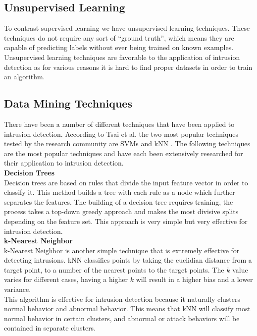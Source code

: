 \documentclass[12pt]{article} %
\begin{document}
\subsection{Unsupervised Learning}
To contrast supervised learning we have unsupervised learning techniques. These techniques do not require any sort of ``ground truth'', which means they are capable of predicting labels without ever being trained on known examples. Unsupervised learning techniques are favorable to the application of intrusion detection as for various reasons it is hard to find proper datasets in order to train an algorithm.\\

\subsection{Data Mining Techniques}
There have been a number of different techniques that have been applied to intrusion detection. According to Tsai et al. the two most popular techniques tested by the research community are SVMs and kNN \cite{tsai09}. The following techniques are the most popular techniques and have each been extensively researched for their application to intrusion detection.\\
 
\noindent
\textbf{Decision Trees}\\
Decision trees are based on rules that divide the input feature vector in order to classify it. This method builds a tree with each rule as a node which further separates the features. The building of a decision tree requires training, the process takes a top-down greedy approach and makes the most divisive splits depending on the feature set. This approach is very simple but very effective for intrusion detection.\\

\noindent
\textbf{k-Nearest Neighbor}\\
k-Nearest Neighbor is another simple technique that is extremely effective for detecting intrusions. kNN classifies points by taking the euclidian distance from a target point, to a number of the nearest points to the target points. The $k$ value varies for different cases, having a higher $k$ will result in a higher bias and a lower variance.\\
This algorithm is effective for intrusion detection because it naturally clusters normal behavior and abnormal behavior. This means that kNN will classify most normal behavior in certain clusters, and abnormal or attack behaviors will be contained in separate clusters.\\
\end{document}
